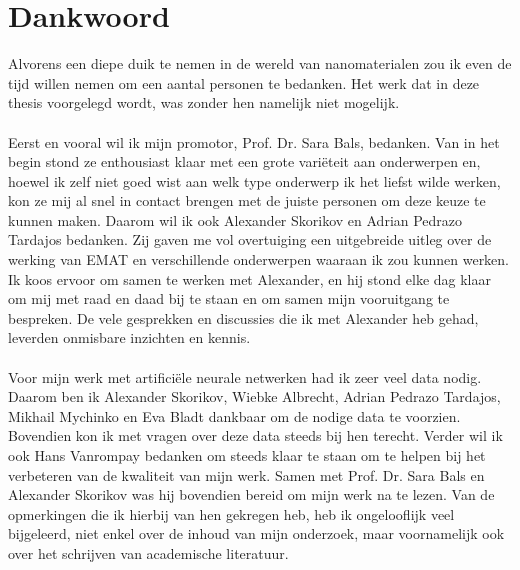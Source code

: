 \documentclass{report}
\begin{document}
\chapter*{Dankwoord}
Alvorens een diepe duik te nemen in de wereld van nanomaterialen zou ik even de tijd willen nemen om een aantal personen te bedanken. Het werk dat in deze thesis voorgelegd wordt, was zonder hen namelijk niet mogelijk.
\\ \\
Eerst en vooral wil ik mijn promotor, Prof. Dr. Sara Bals, bedanken. Van in het begin stond ze enthousiast klaar met een grote variëteit aan onderwerpen en, hoewel ik zelf niet goed wist aan welk type onderwerp ik het liefst wilde werken, kon ze mij al snel in contact brengen met de juiste personen om deze keuze te kunnen maken. Daarom wil ik ook Alexander Skorikov en Adrian Pedrazo Tardajos bedanken. Zij gaven me vol overtuiging een uitgebreide uitleg over de werking van EMAT en verschillende onderwerpen waaraan ik zou kunnen werken. Ik koos ervoor om samen te werken met Alexander, en hij stond elke dag klaar om mij met raad en daad bij te staan en om samen mijn vooruitgang te bespreken. De vele gesprekken en discussies die ik met Alexander heb gehad, leverden onmisbare inzichten en kennis.
\\ \\
Voor mijn werk met artificiële neurale netwerken had ik zeer veel data nodig. Daarom ben ik Alexander Skorikov, Wiebke Albrecht, Adrian Pedrazo Tardajos, Mikhail Mychinko en Eva Bladt dankbaar om de nodige data te voorzien. Bovendien kon ik met vragen over deze data steeds bij hen terecht. Verder wil ik ook Hans Vanrompay bedanken om steeds klaar te staan om te helpen bij het verbeteren van de kwaliteit van mijn werk. Samen met Prof. Dr. Sara Bals en Alexander Skorikov was hij bovendien bereid om mijn werk na te lezen. Van de opmerkingen die ik hierbij van hen gekregen heb, heb ik ongelooflijk veel bijgeleerd, niet enkel over de inhoud van mijn onderzoek, maar voornamelijk ook over het schrijven van academische literatuur.


\newpage
\tableofcontents
\end{document}
